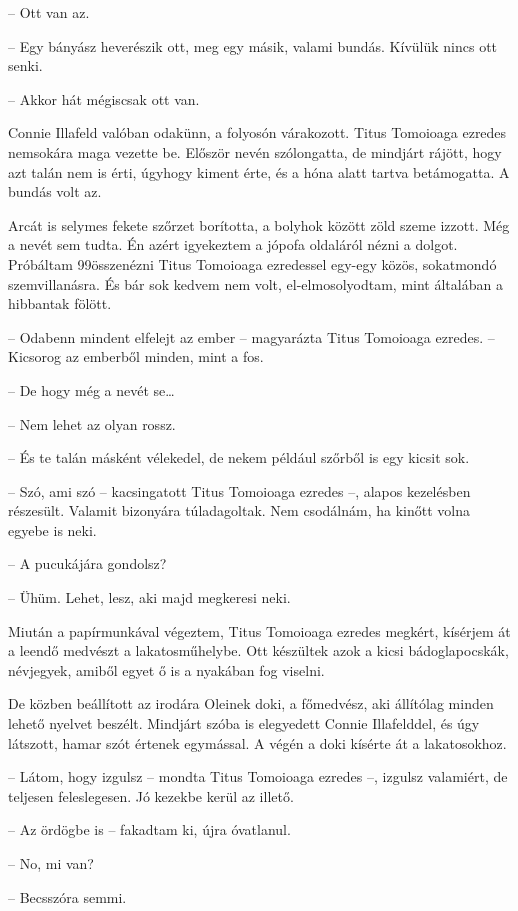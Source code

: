 \documentclass{IEEEtran}
\begin{document}
– Ott van az.

– Egy bányász heverészik ott, meg egy másik, valami bundás. Kívülük nincs ott
senki.

– Akkor hát mégiscsak ott van.

Connie Illafeld valóban odakünn, a folyosón várakozott. Titus Tomoioaga
ezredes nemsokára maga vezette be. Először nevén szólongatta, de mindjárt
rájött, hogy azt talán nem is érti, úgyhogy kiment érte, és a hóna alatt
tartva betámogatta. A bundás volt az.

Arcát is selymes fekete szőrzet borította, a bolyhok között zöld szeme izzott.
Még a nevét sem tudta. Én azért igyekeztem a jópofa oldaláról nézni a dolgot.
Próbáltam 99összenézni Titus Tomoioaga ezredessel egy-egy közös, sokatmondó
szemvillanásra. És bár sok kedvem nem volt, el-elmosolyodtam, mint általában a
hibbantak fölött.

– Odabenn mindent elfelejt az ember – magyarázta Titus Tomoioaga ezredes. –
Kicsorog az emberből minden, mint a fos.

– De hogy még a nevét se…

– Nem lehet az olyan rossz.

– És te talán másként vélekedel, de nekem például szőrből is egy kicsit sok.

– Szó, ami szó – kacsingatott Titus Tomoioaga ezredes –, alapos kezelésben
részesült. Valamit bizonyára túladagoltak. Nem csodálnám, ha kinőtt volna
egyebe is neki.

– A pucukájára gondolsz?

– Ühüm. Lehet, lesz, aki majd megkeresi neki.

Miután a papírmunkával végeztem, Titus Tomoioaga ezredes megkért, kísérjem át
a leendő medvészt a lakatosműhelybe. Ott készültek azok a kicsi
bádoglapocskák, névjegyek, amiből egyet ő is a nyakában fog viselni.

De közben beállított az irodára Oleinek doki, a főmedvész, aki állítólag
minden lehető nyelvet beszélt. Mindjárt szóba is elegyedett Connie
Illafelddel, és úgy látszott, hamar szót értenek egymással. A végén a doki
kísérte át a lakatosokhoz.

– Látom, hogy izgulsz – mondta Titus Tomoioaga ezredes –, izgulsz valamiért,
de teljesen feleslegesen. Jó kezekbe kerül az illető.

– Az ördögbe is – fakadtam ki, újra óvatlanul.

– No, mi van?

– Becsszóra semmi.
\end{document}
